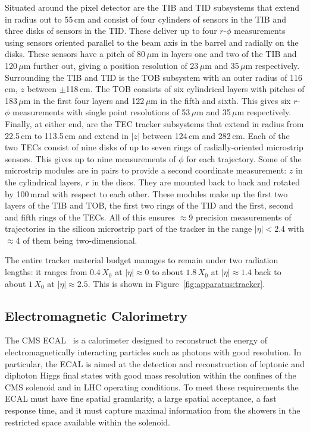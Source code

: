 Situated around the pixel detector are the TIB and TID subsystems that extend in radius out to 55\,cm and consist of four cylinders of sensors in the TIB and three disks of sensors in the TID. These deliver up to four $r$-$\phi$ measurements using sensors oriented parallel to the beam axis in the barrel and radially on the disks. These sensors have a pitch of 80\,$\mu$m in layers one and two of the TIB and 120\,$\mu$m further out, giving a position resolution of 23\,$\mu$m and 35\,$\mu$m respectively. 
Surrounding the TIB and TID is the TOB subsystem with an outer radius of 116\,cm, $z$ between $\pm$118\,cm. The TOB consists of six cylindrical layers with pitches of 183\,$\mu$m in the first four layers and 122\,$\mu$m in the fifth and sixth. This gives six $r$-$\phi$ measurements with single point resolutions of 53\,$\mu$m and 35\,$\mu$m respectively. 
Finally, at either end, are the TEC tracker subsystems that extend in radius from 22.5\,cm to 113.5\,cm and extend in $|z|$ between 124\,cm and 282\,cm. Each of the two TECs consist of nine disks of up to seven rings of radially-oriented microstrip sensors. This gives up to nine measurements of $\phi$ for each trajectory.  
Some of the microstrip modules are in pairs to provide a second coordinate measurement: $z$ in the cylindrical layers, $r$ in the discs. They are mounted back to back and rotated by 100\,mrad with respect to each other. These modules make up the first two layers of the TIB and TOB, the first two rings of the TID and the first, second and fifth rings of the TECs.  
All of this ensures $\approx$9 precision measurements of trajectories in the silicon microstrip part of the tracker in the range $|\eta|<2.4$ with $\approx$4 of them being two-dimensional.


The entire tracker material budget manages to remain under two radiation lengths: it ranges from $0.4$\,$X_{0}$ at $|\eta|\approx{0}$ to about $1.8$\,$X_{0}$ at $|\eta|\approx{1.4}$ back to about $1$\,$X_{0}$ at $|\eta|\approx{2.5}$. This is shown in Figure~\ref{fig:apparatus:tracker}.


\subsection{Electromagnetic Calorimetry}

The CMS ECAL~\cite{CMSEcalTDR} is a calorimeter designed to reconstruct the energy of electromagnetically interacting particles such as photons with good resolution. In particular, the ECAL is aimed at the detection and reconstruction of leptonic and diphoton Higgs final states with good mass resolution within the confines of the CMS solenoid and in LHC operating conditions. To meet these requirements the ECAL must have fine spatial granularity, a large spatial acceptance, a fast response time, and it must capture maximal information from the showers in the restricted space available within the solenoid. 

